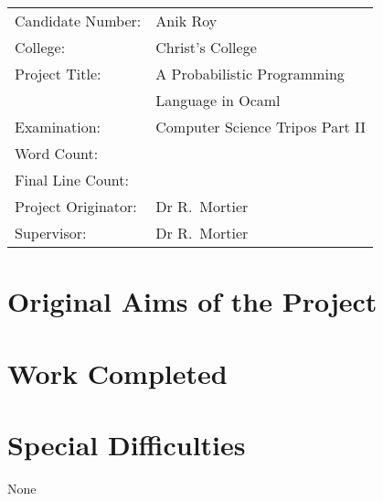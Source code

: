 \immediate{}
\immediate{}

{\large

\begin{tabular}{ll}
Candidate Number:               &  Anik Roy                       \\
College:            &  Christ's College                     \\
Project Title:      &  A Probabilistic Programming \\
&
 Language in Ocaml \\
Examination:        & Computer Science Tripos Part II        \\
Word Count:  
& \footnotemark[1]\\
Final Line Count:         & \footnotemark[2] \\
Project Originator: & Dr R.~Mortier                    \\
Supervisor:         & Dr R.~Mortier                    \\ 
\end{tabular}
}



\section*{Original Aims of the Project}

\section*{Work Completed}

\section*{Special Difficulties}
None



